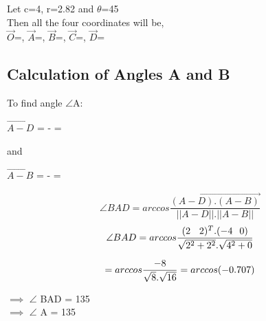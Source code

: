 \documentclass[journal,10pt,twocolumn]{article}
\begin{document}
Let c=4, r=2.82 and $\theta$=45 \textdegree \\

Then all the four coordinates will be, \\

\vspace{0.3cm}
$\vec{O}$=, $\vec{A}$=, $\vec{B}$=, $\vec{C}$=, $\vec{D}$=
\\

\subsection{Calculation of Angles A and B}
\vspace{0.25cm}
To find angle $\angle$A:\\

\begin{center}
    

$\vec{A-D}$ =  - 
	= 

\begin{flushleft}
and \\
\end{flushleft}


$\vec{A-B}$ =  - = 
	\\

\end{center}
\vspace{0.4cm}
\begin{equation}
\angle BAD = arccos \vec{\frac{(A-D).(A-B)}{||A-D ||. ||A-B||}}
\end{equation}
\vspace{0.4cm}
\begin{equation}
\angle BAD = arccos \frac{(2 \hspace{0.32cm}  2)^T . (-4 \hspace{0.25cm}   0) } {\sqrt{2^2+2^2}.\sqrt{4^2+0}}
\end{equation}

\begin{equation}
= arccos \frac{-8 } {\sqrt{8}.\sqrt{16}} = arccos (-0.707) 
\\
\end{equation}
\begin{flushleft}
$\implies$   $\angle$ BAD = 135 \textdegree\\
\vspace{0.3cm}
$\implies$   $\angle$ A = 135 \textdegree
\end{flushleft}
\end{document}

